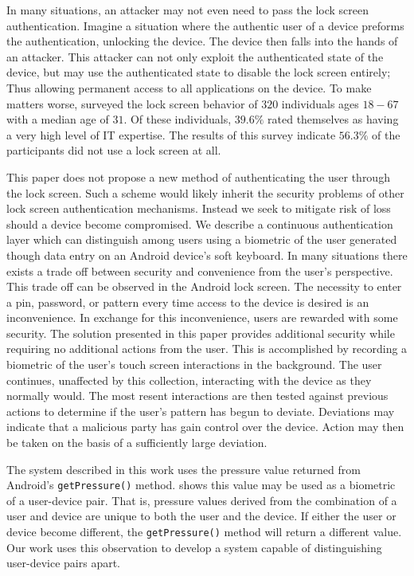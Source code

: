 In many situations,
an attacker may not even need to pass the lock screen authentication.
Imagine a situation where the authentic user of a device preforms the authentication,
unlocking the device.
The device then falls into the hands of an attacker.
This attacker can not only exploit the authenticated state of the device,
but may use the authenticated state to disable the lock screen entirely;
Thus allowing permanent access to all applications on the device.
%
To make matters worse,
\cite{harbach2014sa} surveyed the lock screen behavior of $320$
individuals ages $18 - 67$ with a median age of $31$.
Of these individuals, $39.6\%$  rated themselves as having
a very high level of IT expertise.
The results of this survey indicate $56.3\%$ of the participants
did not use a lock screen at all.

This paper does not propose a new method of
authenticating the user through the lock screen.
Such a scheme would likely inherit
the security problems of other 
lock screen authentication mechanisms.
%
Instead we seek to mitigate risk of loss should a
device become compromised.
We describe a continuous authentication
layer which can distinguish among users
using a biometric of the user
generated though data entry on an Android device's soft keyboard.
%
In many situations there exists a trade off between
security and convenience from the user's perspective.
%
This trade off can be observed in the Android lock screen.
The necessity to enter a pin, password, or pattern 
every time access to the device is desired is 
an inconvenience.
In exchange for this inconvenience,
users are rewarded with some security.
%
The solution presented in this paper
provides additional security while requiring
no additional actions from the user.
%
This is accomplished by
recording a biometric of 
the user's touch screen interactions
in the background.
The user continues, unaffected by this collection, 
interacting with the device as they normally would.
%
The most resent interactions are then
tested against previous actions
to determine if the user's
pattern has begun to deviate.
%
Deviations may indicate that a
malicious party has gain control over the device.
Action may then be taken
on the basis of a sufficiently large deviation.

% 
The system described in this work uses
the pressure value returned from
Android's {\tt getPressure()} method.
%
\cite{ScheelTyagi15} shows this value may
be used as a biometric of a user-device pair.
That is,
pressure values derived from the combination
of a user and device are unique to both
the user and the device.
If either the user or device become different,
the {\tt getPressure()} method will return a different value.
%
Our work uses this observation 
to develop a system 
capable of distinguishing user-device pairs apart.

